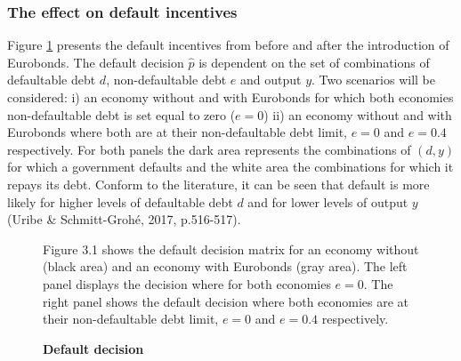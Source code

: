 \subsubsection{The effect on default incentives}
Figure \ref{fig:default decision} presents the default incentives from before and after the introduction of Eurobonds. The default decision $\hat{p}$ is dependent on the set of combinations of defaultable debt $d$, non-defaultable debt $e$ and output $y$. Two scenarios will be considered: i) an economy without and with Eurobonds for which both economies non-defaultable debt is set equal to zero ($e = 0$) ii) an economy without and with Eurobonds where both are at their non-defaultable debt limit, $e = 0$ and $e = 0.4$ respectively. For both panels the dark area represents the combinations of $(d,y)$ for which a government defaults and the white area the combinations for which it repays its debt. Conform to the literature, it can be seen that default is more likely for higher levels of defaultable debt $d$ and for lower levels of output $y$ (Uribe \& Schmitt-Grohé, 2017, p.516-517).\\
\begin{figure}[H]
\caption{\textbf{Default decision}}
    \centering
    \vspace{1mm}
    \label{fig:default decision}
        \begin{tablenotes}
      \footnotesize
    Figure 3.1 shows the default decision matrix for an economy without (black area) and an economy with Eurobonds (gray area). The left panel displays the decision where for both economies $e = 0$. The right panel shows the default decision where both economies are at their non-defaultable debt limit, $e = 0$ and $e = 0.4$ respectively.
    \end{tablenotes}
\end{figure}
